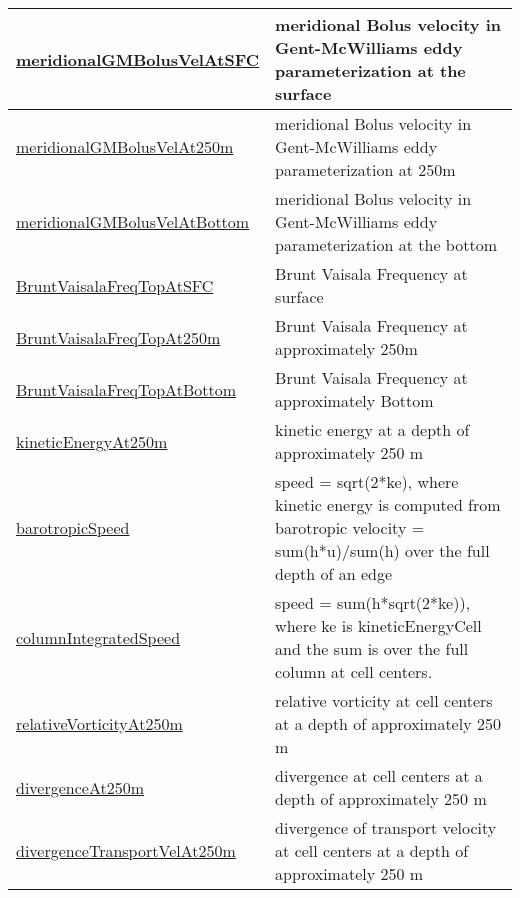 {\begin{center}
\begin{longtable}{| p{2.0in} | p{4.0in} |}
    \hline
    \hyperref[subsec:var_sec_highFrequencyOutputAM_meridionalGMBolusVelAtSFC]{meridionalGMBolusVelAtSFC} & meridional Bolus velocity in Gent-McWilliams eddy parameterization at the surface \\
    \hline
    \hyperref[subsec:var_sec_highFrequencyOutputAM_meridionalGMBolusVelAt250m]{meridionalGMBolusVelAt250m} & meridional Bolus velocity in Gent-McWilliams eddy parameterization at 250m \\
    \hline
    \hyperref[subsec:var_sec_highFrequencyOutputAM_meridionalGMBolusVelAtBottom]{meridionalGMBolusVelAtBottom} & meridional Bolus velocity in Gent-McWilliams eddy parameterization at the bottom \\
    \hline
    \hyperref[subsec:var_sec_highFrequencyOutputAM_BruntVaisalaFreqTopAtSFC]{BruntVaisalaFreqTopAtSFC} & Brunt Vaisala Frequency at surface \\
    \hline
    \hyperref[subsec:var_sec_highFrequencyOutputAM_BruntVaisalaFreqTopAt250m]{BruntVaisalaFreqTopAt250m} & Brunt Vaisala Frequency at approximately 250m \\
    \hline
    \hyperref[subsec:var_sec_highFrequencyOutputAM_BruntVaisalaFreqTopAtBottom]{BruntVaisalaFreqTopAtBottom} & Brunt Vaisala Frequency at approximately Bottom \\
    \hline
    \hyperref[subsec:var_sec_highFrequencyOutputAM_kineticEnergyAt250m]{kineticEnergyAt250m} & kinetic energy at a depth of approximately 250 m \\
    \hline
    \hyperref[subsec:var_sec_highFrequencyOutputAM_barotropicSpeed]{barotropicSpeed} & speed = sqrt(2*ke), where kinetic energy is computed from barotropic velocity = sum(h*u)/sum(h) over the full depth of an edge \\
    \hline
    \hyperref[subsec:var_sec_highFrequencyOutputAM_columnIntegratedSpeed]{columnIntegratedSpeed} & speed = sum(h*sqrt(2*ke)), where ke is kineticEnergyCell and the sum is over the full column at cell centers. \\
    \hline
    \hyperref[subsec:var_sec_highFrequencyOutputAM_relativeVorticityAt250m]{relativeVorticityAt250m} & relative vorticity at cell centers at a depth of approximately 250 m \\
    \hline
    \hyperref[subsec:var_sec_highFrequencyOutputAM_divergenceAt250m]{divergenceAt250m} & divergence at cell centers at a depth of approximately 250 m \\
    \hline
    \hyperref[subsec:var_sec_highFrequencyOutputAM_divergenceTransportVelAt250m]{divergenceTransportVelAt250m} & divergence of transport velocity at cell centers at a depth of approximately 250 m \\

\end{longtable}
\end{center}}
